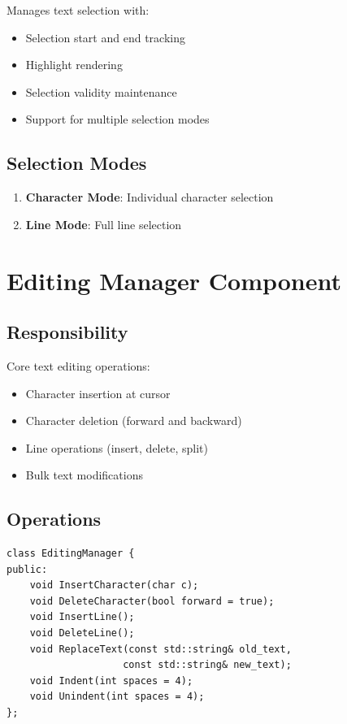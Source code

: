 \documentclass[12pt,a4paper,oneside,openany]{report}
\begin{document}
Manages text selection with:

\begin{itemize}
	\item Selection start and end tracking
	\item Highlight rendering
	\item Selection validity maintenance
	\item Support for multiple selection modes
\end{itemize}

\subsection{Selection Modes}

\begin{enumerate}
	\item \textbf{Character Mode}: Individual character selection
	\item \textbf{Line Mode}: Full line selection
\end{enumerate}

\section{Editing Manager Component}

\subsection{Responsibility}

Core text editing operations:

\begin{itemize}
	\item Character insertion at cursor
	\item Character deletion (forward and backward)
	\item Line operations (insert, delete, split)
	\item Bulk text modifications
\end{itemize}

\subsection{Operations}

\begin{lstlisting}
class EditingManager {
public:
    void InsertCharacter(char c);
    void DeleteCharacter(bool forward = true);
    void InsertLine();
    void DeleteLine();
    void ReplaceText(const std::string& old_text, 
                    const std::string& new_text);
    void Indent(int spaces = 4);
    void Unindent(int spaces = 4);
};
\end{lstlisting}
\end{document}

